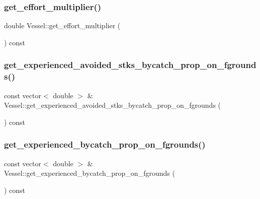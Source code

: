 \mbox{\label{class_vessel_a7539c706097302bcb0c4eff59c5f656d}} 
\subsubsection{\texorpdfstring{get\_effort\_multiplier()}{get\_effort\_multiplier()}}
{\footnotesize\ttfamily double Vessel\+::get\+\_\+effort\+\_\+multiplier (\begin{DoxyParamCaption}{ }\end{DoxyParamCaption}) const}

\mbox{\label{class_vessel_a4f786de4fcd50356c94a5d68df2f4dcf}} 
\subsubsection{\texorpdfstring{get\_experienced\_avoided\_stks\_bycatch\_prop\_on\_fgrounds()}{get\_experienced\_avoided\_stks\_bycatch\_prop\_on\_fgrounds()}}
{\footnotesize\ttfamily const vector$<$ double $>$ \& Vessel\+::get\+\_\+experienced\+\_\+avoided\+\_\+stks\+\_\+bycatch\+\_\+prop\+\_\+on\+\_\+fgrounds (\begin{DoxyParamCaption}{ }\end{DoxyParamCaption}) const}

\mbox{\label{class_vessel_a63281d8bf564ccd5a25bbfad3e7f28c7}} 
\subsubsection{\texorpdfstring{get\_experienced\_bycatch\_prop\_on\_fgrounds()}{get\_experienced\_bycatch\_prop\_on\_fgrounds()}}
{\footnotesize\ttfamily const vector$<$ double $>$ \& Vessel\+::get\+\_\+experienced\+\_\+bycatch\+\_\+prop\+\_\+on\+\_\+fgrounds (\begin{DoxyParamCaption}{ }\end{DoxyParamCaption}) const}

